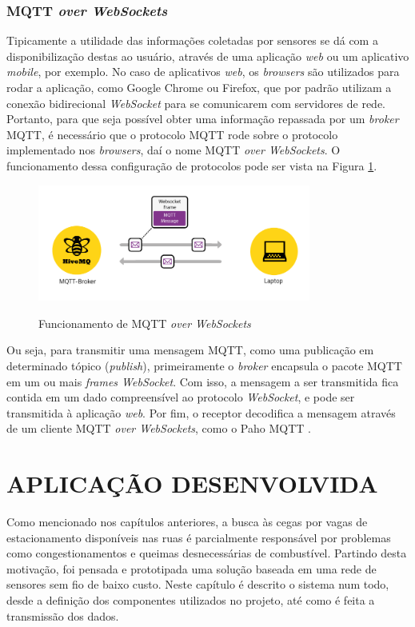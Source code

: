 \documentclass[oneside,openright,12pt]{ufsm_2015} %
\begin{document}
\subsection{MQTT \textit{over WebSockets}}
Tipicamente a utilidade das informações coletadas por sensores se dá com a disponibilização destas ao usuário, através de uma aplicação \textit{web} ou um aplicativo \textit{mobile}, por exemplo. No caso de aplicativos \textit{web}, os \textit{browsers} são utilizados para rodar a aplicação, como Google Chrome ou Firefox, que por padrão utilizam a conexão bidirecional \textit{WebSocket} para se comunicarem com servidores de rede. Portanto, para que seja possível obter uma informação repassada por um \textit{broker} MQTT, é necessário que o protocolo MQTT rode sobre o protocolo implementado nos \textit{browsers}, daí o nome MQTT \textit{over WebSockets}. O funcionamento dessa configuração de protocolos pode ser vista na Figura \ref{fig:mqtt-over-websockets}.

\begin{figure}[H]
    \caption{\label{exepretex} Funcionamento de MQTT \textit{over WebSockets}}
    \centering
    \includegraphics[width=0.8\textwidth]{figuras/websockets.png}
    \vspace{\baselineskip} %
        \label{fig:mqtt-over-websockets}
\end{figure}

Ou seja, para transmitir uma mensagem MQTT, como uma publicação em determinado tópico (\textit{publish}), primeiramente o \textit{broker} encapsula o pacote MQTT em um ou mais \textit{frames WebSocket}. Com isso, a mensagem a ser transmitida fica contida em um dado compreensível ao protocolo \textit{WebSocket}, e pode ser transmitida à aplicação \textit{web}. Por fim, o receptor decodifica a mensagem através de um cliente MQTT \textit{over WebSockets}, como o Paho MQTT \cite{paho-mqtt}.


\chapter{APLICAÇÃO DESENVOLVIDA}
Como mencionado nos capítulos anteriores, a busca às cegas por vagas de estacionamento disponíveis nas ruas é parcialmente responsável por problemas como congestionamentos e queimas desnecessárias de combustível. Partindo desta motivação, foi pensada e prototipada uma solução baseada em uma rede de sensores sem fio de baixo custo. 
Neste capítulo é descrito o sistema num todo, desde a definição dos componentes utilizados no projeto, até como é feita a transmissão dos dados.
    
\end{document}
